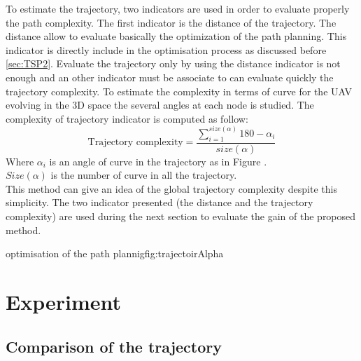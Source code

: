 To estimate the trajectory, two indicators are used in order to evaluate properly the path complexity. The first indicator is the distance of the trajectory. The distance allow to evaluate basically the optimization of the path planning. This indicator is directly include in the optimisation process as discussed before \ref{sec:TSP2}. 
Evaluate the trajectory only by using the distance indicator is not enough and an other indicator must be associate to can evaluate quickly the trajectory complexity. To estimate the complexity in terms of curve for the UAV evolving in the 3D space the several angles at each node is studied. 
The complexity of trajectory indicator is computed as follow: 
\begin{equation}\label{Eq:trajectory}
\mbox{Trajectory complexity}=\frac{ \sum_{i=1}^{size(\alpha)} 180- \alpha_{i}  }{size(\alpha)}   
\end{equation}
Where $\alpha_i$ is an angle of curve in the trajectory as in Figure . \\
$Size(\alpha)$ is the number of curve in all the trajectory.\\ 
This method  can give an idea of the global trajectory complexity despite this simplicity. 
The two indicator presented (the distance and the trajectory complexity) are used during the next section  to evaluate the gain of the proposed method.
	
 \begin{mfigures}[!]{optimisation of the path plannig}{fig:trajectoirAlpha} \centering
{}
\end{mfigures} 
	
	
				



			\section{Experiment}
		\subsection{Comparison of the trajectory} \label{trajectoire path}
 
%  

